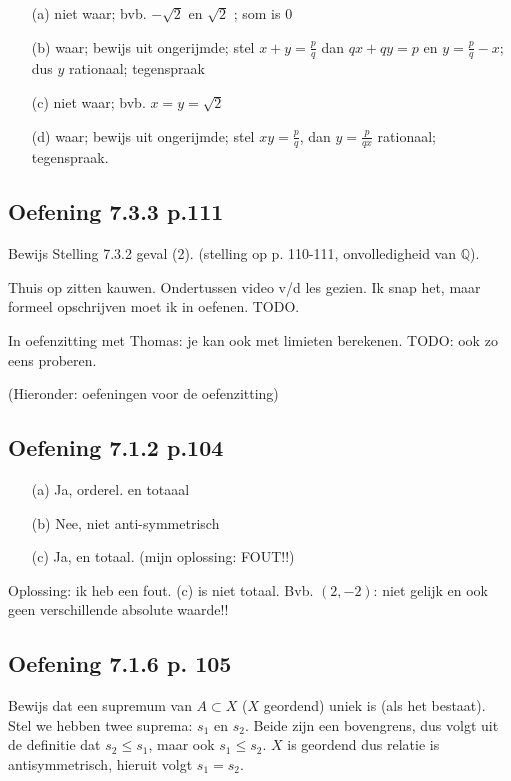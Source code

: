 \documentclass{article}
\begin{document}
\begin{itemize}
    \item [(a)] niet waar; bvb. $-\sqrt{2}$ en $\sqrt{2}$ ; som is 0
    \item [(b)] waar; bewijs uit ongerijmde; stel $x+y=\frac{p}{q}$ dan $qx + qy = p$ en $y=\frac{p}{q}-x$; dus $y$ rationaal; tegenspraak
    \item [(c)] niet waar; bvb. $x=y=\sqrt{2}$ 
    \item [(d)] waar; bewijs uit ongerijmde; stel $xy=\frac{p}{q}$, dan $y=\frac{p}{qx}$ rationaal; tegenspraak.
\end{itemize}

\subsection*{Oefening 7.3.3 p.111}
Bewijs Stelling 7.3.2 geval (2). (stelling op p. 110-111, onvolledigheid van $\mathbb{Q}$). 

Thuis op zitten kauwen. Ondertussen video v/d les gezien. Ik snap het, maar formeel opschrijven moet ik in oefenen. TODO. 

In oefenzitting met Thomas: je kan ook met limieten berekenen. TODO: ook zo eens proberen. 

(Hieronder: oefeningen voor de oefenzitting)
\subsection*{Oefening 7.1.2 p.104}
\begin{itemize}
    \item [(a)] Ja, orderel. en totaaal
    \item [(b)] Nee, niet anti-symmetrisch
    \item [(c)] Ja, en totaal. (mijn oplossing: FOUT!!)
\end{itemize}

Oplossing: ik heb een fout. (c) is niet totaal. Bvb. $(2,-2)$: niet gelijk en ook geen verschillende absolute waarde!! 

\subsection*{Oefening 7.1.6 p. 105} 
Bewijs dat een supremum van $A \subset X$ ($X$ geordend) uniek is (als het bestaat). 
Stel we hebben twee suprema: $s_1$ en $s_2$. Beide zijn een bovengrens, dus volgt uit de definitie dat $s_2 \leq s_1$, maar ook $s_1 \leq s_2$. $X$ is geordend dus relatie is antisymmetrisch, hieruit volgt $s_1 = s_2$. 
\end{document}
